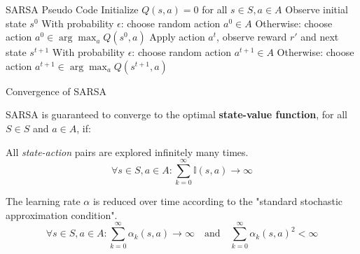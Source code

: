 \begin{frame}[fragile]{SARSA Pseudo Code}
    \centering 
        \State Initialize \( Q(s, a) = 0 \) for all \( s \in S, a \in A \)
            \State Observe initial state \( s^0 \)
            \State With probability \( \epsilon \): choose random action \( a^0 \in A \)
            \State Otherwise: choose action \( a^0 \in \arg\max_a Q(s^0, a) \)
                \State Apply action \( a^t \), observe reward \( r' \) and next state \( s^{t+1} \)
                \State With probability \( \epsilon \): choose random action \( a^{t+1} \in A \)
                \State Otherwise: choose action \( a^{t+1} \in \arg\max_a Q(s^{t+1}, a) \)
                \State {}
            \EndFor
        \EndFor
    \ealg
\end{frame}

\begin{frame}{Convergence of SARSA}

    SARSA is guaranteed to converge to the optimal \textbf{state-value function}, for all $S \in S$ and $a \in A$, if:
    \vspace{10pt}
    \blist
        \item All \textit{state-action} pairs are explored infinitely many times. $$\forall s \in S, a \in A: \sum_{k=0}^{\infty} \mathbb{I}(s, a) \to \infty $$
        \item The learning rate $\alpha$ is reduced over time according to the "standard stochastic approximation condition". $$\forall s \in S, a \in A: \sum_{k=0}^{\infty} \alpha_k(s, a) \to \infty \quad \text{and} \quad \sum_{k=0}^{\infty} \alpha_k(s, a)^2 < \infty$$
    \elist        
\end{frame}

